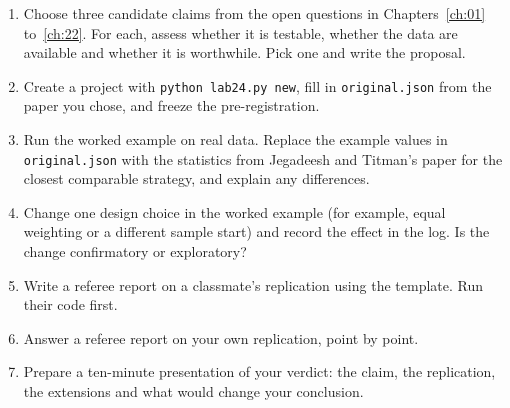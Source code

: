 \begin{enumerate}
  \item Choose three candidate claims from the open questions in Chapters~\ref{ch:01} to~\ref{ch:22}. For each, assess whether it is testable, whether the data are available and whether it is worthwhile. Pick one and write the proposal.
  \item Create a project with \texttt{python lab24.py new}, fill in \texttt{original.json} from the paper you chose, and freeze the pre-registration.
  \item {\sloppy Run the worked example on real data. Replace the example values in \texttt{original.json} with the statistics from Jegadeesh and Titman's paper for the closest comparable strategy, and explain any differences.\par}
  \item Change one design choice in the worked example (for example, equal weighting or a different sample start) and record the effect in the log. Is the change confirmatory or exploratory?
  \item Write a referee report on a classmate's replication using the template. Run their code first.
  \item Answer a referee report on your own replication, point by point.
  \item Prepare a ten-minute presentation of your verdict: the claim, the replication, the extensions and what would change your conclusion.
\end{enumerate}

